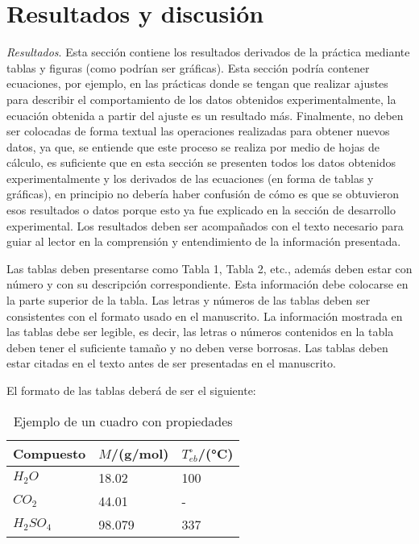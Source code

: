 \documentclass{replab}
\begin{document}
\section{Resultados y discusión}

\textit{Resultados}. Esta sección contiene los resultados derivados de la práctica mediante tablas y figuras (como podrían ser gráficas). Esta sección podría contener ecuaciones, por ejemplo, en las prácticas donde se tengan que realizar ajustes para describir el comportamiento de los datos obtenidos experimentalmente, la ecuación obtenida a partir del ajuste es un resultado más. Finalmente, no deben ser colocadas de forma textual las operaciones realizadas para obtener nuevos datos, ya que, se entiende que este proceso se realiza por medio de hojas de cálculo, es suficiente que en esta sección se presenten todos los datos obtenidos experimentalmente y los derivados de las ecuaciones (en forma de tablas y gráficas), en principio no debería haber confusión de cómo es que se obtuvieron esos resultados o datos porque esto ya fue explicado en la sección de desarrollo experimental. Los resultados deben ser acompañados con el texto necesario para guiar al lector en la comprensión y entendimiento de la información presentada.

Las tablas deben presentarse como Tabla 1, Tabla 2, etc., además deben estar con número y con su descripción correspondiente. Esta información debe colocarse en la parte superior de la tabla. Las letras y números de las tablas deben ser consistentes con el formato usado en el manuscrito. La información mostrada en las tablas debe ser legible, es decir, las letras o números contenidos en la tabla deben tener el suficiente tamaño y no deben verse borrosas. Las tablas deben estar citadas en el texto antes de ser presentadas en el manuscrito.

El formato de las tablas deberá de ser el siguiente:

\begin{table}[hbt!]
    \centering
    \footnotesize
    \caption{Ejemplo de un cuadro con propiedades}
    \label{tab:propiedades}
    \begin{tabularx}{\columnwidth}{lYY}
            \hline
            \textbf{Compuesto} & \textbf{$M$/(g/mol)} & \textbf{$T_{eb}^{\circ}$/(°C)} \\
            \hline
            $H_2O$      & 18.02     & 100   \\
            $CO_2$      & 44.01     & -     \\
            $H_2SO_4$   & 98.079    & 337   \\
            \hline
    \end{tabularx}
\end{table}
\end{document}
